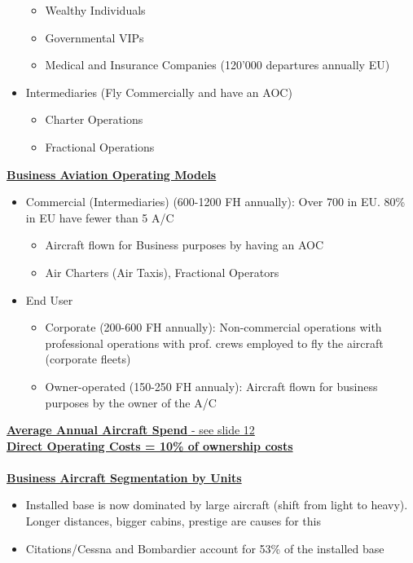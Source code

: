 \documentclass[9pt, landscape, fleqn]{scrartcl}
\begin{document}
\begin{multicols*}{3}
\begin{itemize}
\begin{itemize}
        \item Wealthy Individuals 
        \item Governmental VIPs 
        \item Medical and Insurance Companies (120'000 departures annually EU)
    \end{itemize}
    \item Intermediaries (Fly Commercially and have an AOC)
    \begin{itemize}
        \item Charter Operations 
        \item Fractional Operations 
    \end{itemize}
\end{itemize}
\underline{\textbf{Business Aviation Operating Models}}
\begin{itemize}
    \item Commercial (Intermediaries) (600-1200 FH annually): Over 700 in EU. 80\% in EU have fewer than 5 A/C
    \begin{itemize}
        \item Aircraft flown for Business purposes by having an AOC 
        \item Air Charters (Air Taxis), Fractional Operators 
    \end{itemize}
    \item End User 
    \begin{itemize}
        \item Corporate (200-600 FH annually): Non-commercial operations with professional operations with prof. crews employed to fly the aircraft (corporate fleets)
        \item Owner-operated (150-250 FH annualy): Aircraft flown for business purposes by the owner of the A/C
    \end{itemize}
\end{itemize}
\underline{\textbf{Average Annual Aircraft Spend} - see slide 12}\\
\underline{\textbf{Direct Operating Costs = 10\% of ownership costs}} \\ \\
\underline{\textbf{Business Aircraft Segmentation by Units}}
\begin{itemize}
    \item Installed base is now dominated by large aircraft (shift from light to heavy). Longer distances, bigger cabins, prestige are causes for this 
    \item Citations/Cessna and Bombardier account for 53\% of the installed base

\end{itemize}
\end{multicols*}
\end{document}
